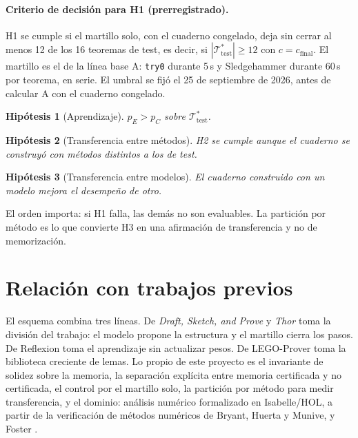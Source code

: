 \documentclass[11pt]{article}
\newtheorem{hypothesis}{Hipótesis}
\theoremstyle{remark}
\newcommand{\T}{\mathcal{T}}
\newcommand{\1}{\mathbb{1}}
\begin{document}
\paragraph{Criterio de decisión para H1 (prerregistrado).} H1 se cumple si el martillo solo, con el cuaderno congelado, deja sin cerrar al menos 12 de los 16 teoremas de test, es decir, si $|\T^*_{\mathrm{test}}|\ge 12$ con $c=c_{\mathrm{final}}$. El martillo es el de la línea base A: \texttt{try0} durante 5\,s y Sledgehammer durante 60\,s por teorema, en serie. El umbral se fijó el 25 de septiembre de 2026, antes de calcular A con el cuaderno congelado.
\begin{hypothesis}[Aprendizaje] $p_E>p_C$ sobre $\T^*_{\mathrm{test}}$.\end{hypothesis}
\begin{hypothesis}[Transferencia entre métodos] H2 se cumple aunque el cuaderno se construyó con métodos distintos a los de test.\end{hypothesis}
\begin{hypothesis}[Transferencia entre modelos] El cuaderno construido con un modelo mejora el desempeño de otro.\end{hypothesis}

El orden importa: si H1 falla, las demás no son evaluables. La partición por método es lo que convierte H3 en una afirmación de transferencia y no de memorización.

\section{Relación con trabajos previos}

El esquema combina tres líneas. De \emph{Draft, Sketch, and Prove} \cite{jiang2023dsp} y \emph{Thor} \cite{jiang2022thor} toma la división del trabajo: el modelo propone la estructura y el martillo cierra los pasos. De Reflexion \cite{shinn2023} toma el aprendizaje sin actualizar pesos. De LEGO-Prover \cite{wang2024lego} toma la biblioteca creciente de lemas. Lo propio de este proyecto es el invariante de solidez sobre la memoria, la separación explícita entre memoria certificada y no certificada, el control por el martillo solo, la partición por método para medir transferencia, y el dominio: análisis numérico formalizado en Isabelle/HOL, a partir de la verificación de métodos numéricos de Bryant, Huerta y Munive, y Foster \cite{bryant2025}.
\end{document}
